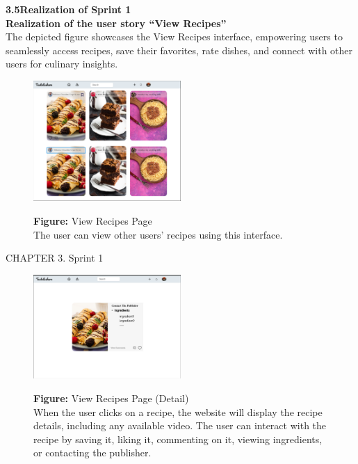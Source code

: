 \documentclass{article}
\begin{document}
{{{{{{{{{\Large \textbf{3.5\hspace{1em}Realization of Sprint 1}}\vspace{0.2cm}
\\\textbf{Realization of the user story “View Recipes”}\\
The depicted figure showcases the View Recipes interface, empowering users to seamlessly access recipes, save their favorites, rate dishes, and connect with other users for culinary insights.\\
\begin{figure}[htbp]
    \centering
    \includegraphics[width=0.5\textwidth]{ViewRecipes} 
    \vspace{0.5cm}
    
    \textbf{Figure:} View Recipes Page \\
    The user can view other users' recipes using this interface.
\end{figure}
\newpage
\noindent
CHAPTER 3.  Sprint 1 \\
\underline{\hspace{\textwidth}} \vspace{0.2cm}

\begin{figure}[htbp]
    \centering
    \includegraphics[width=0.5\textwidth]{ViewRecipes2} 
    \vspace{0.5cm}
    
    \textbf{Figure:} View Recipes Page (Detail) \\
    When the user clicks on a recipe, the website will display the recipe details, including any available video. The user can interact with the recipe by saving it, liking it, commenting on it, viewing ingredients, or contacting the publisher.
\end{figure}

}}}}}}}}
\end{document}
